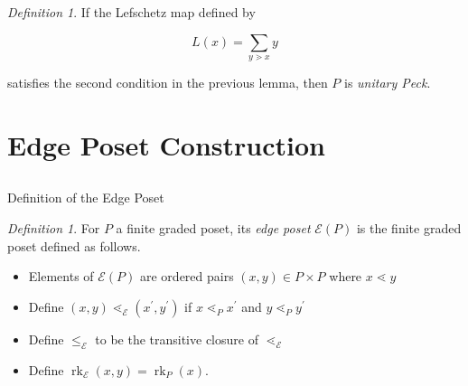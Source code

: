 \documentclass{beamer}
\theoremstyle{remark}
\newtheorem{defn}[thm]{Definition}
\newcommand\rk{\operatorname{rk}}
\begin{document}
\begin{frame}
\begin{defn}
If the Lefschetz map defined by

$$L(x) = \sum_{y\gtrdot x} y$$

satisfies the second condition in the previous lemma, then $P$ is \textit{unitary Peck}.
\end{defn}
\end{frame}








\section{Edge Poset Construction}
\subsection{}

\begin{frame}{Definition of the Edge Poset}
\begin{defn}
\label{defn:functor_of_edges}
For $P$ a finite graded poset, its \textit{edge poset} $\mathcal{E}(P)$ is the finite graded poset defined as follows. 
\begin{itemize}

\item Elements of $\mathcal{E}(P)$ are ordered pairs $(x,y)\in P\times P$ where $x\lessdot y$

\item Define $(x,y) \lessdot_{\mathcal{E}} (x^\prime,y^\prime)$ if $x\lessdot_P x^\prime$ and $y\lessdot_P y^\prime$

\item Define $\le_{\mathcal{E}}$ to be the transitive closure of $\lessdot_{\mathcal{E}}$

\item Define $\rk_{\mathcal{E}}(x,y) = \rk_P(x)$.
\end{itemize}
\end{defn}
\end{frame}
\end{document}
